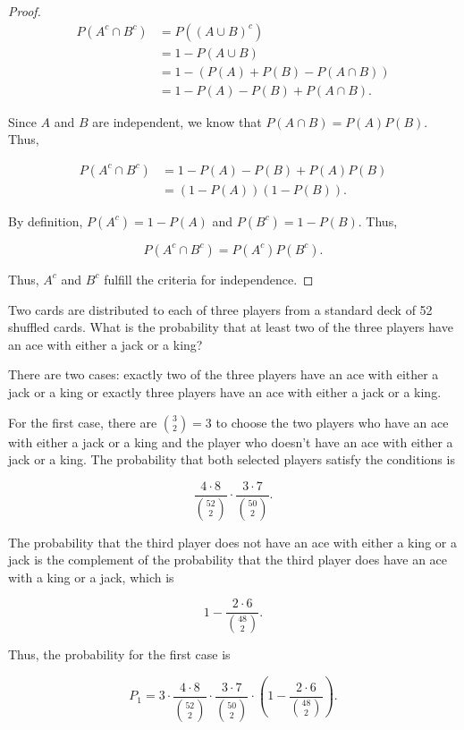 \documentclass[answers]{exam}
\begin{document}
\begin{questions}
\begin{solution}
\begin{proof}
\begin{align*}
P(A^{c} \cap B^{c}) &= P((A \cup B)^{c}) \\ 
&= 1 - P(A \cup B) \\ 
&= 1 - (P(A) + P(B) - P(A \cap B)) \\
&= 1 - P(A) - P(B) + P(A \cap B)
.\end{align*}

Since $A$ and $B$ are independent, we know that $P(A \cap B) = P(A)P(B)$.
Thus,

\begin{align*}
P(A^{c} \cap B^{c}) &= 1 - P(A) - P(B) + P(A)P(B) \\ 
&= (1 - P(A))(1 - P(B))
.\end{align*}

By definition, $P(A^{c}) = 1 - P(A)$ and $P(B^{c}) = 1 - P(B)$. Thus,

\[
P(A^{c} \cap B^{c}) = P(A^{c})P(B^{c})
.\] 

Thus, $A^{c}$ and $B^{c}$ fulfill the criteria for independence.
\end{proof}
\end{solution}

\question [10] Two cards are distributed to each of three players from a 
standard deck of 52 shuffled cards. What is the probability that at least two 
of the three players have an ace with either a jack or a king?

\begin{solution}
There are two cases: exactly two of the three players have an ace with either 
a jack or a king or exactly three players have an ace with either a jack or a 
king.

For the first case, there are $\binom{3}{2} = 3$ to choose the two players 
who have an ace with either a jack or a king and the player who doesn't have 
an ace with either a jack or a king. The probability that both selected 
players satisfy the conditions is

\[
\frac{4 \cdot 8}{\binom{52}{2}} \cdot \frac{3 \cdot 7}{\binom{50}{2}}
.\] 

The probability that the third player does not have an ace with either
a king or a jack is the complement of the probability that the third
player does have an ace with a king or a jack, which is

\[
1 - \frac{2 \cdot 6}{\binom{48}{2}}
.\] 

Thus, the probability for the first case is

\[
P_1 = 3 \cdot \frac{4 \cdot 8}{\binom{52}{2}} \cdot \frac{3 \cdot 7}{\binom{50}{2}} \cdot \left( 1 - \frac{2 \cdot 6}{\binom{48}{2}} \right) 
.\] 


\end{solution}
\end{questions}
\end{document}
